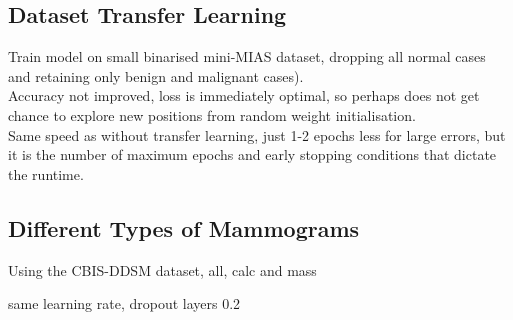 \subsection{Dataset Transfer Learning}

Train model on small binarised mini-MIAS dataset, dropping all normal cases and retaining only benign and malignant cases).\\

Accuracy not improved, loss is immediately optimal, so perhaps does not  get chance to explore new positions from random weight initialisation.\\

Same speed as without transfer learning, just 1-2 epochs less for large errors, but it is the number of maximum  epochs and early stopping conditions that dictate the runtime.

\subsection{Different Types of Mammograms}

Using the CBIS-DDSM dataset, all, calc and mass

same learning rate, dropout layers 0.2